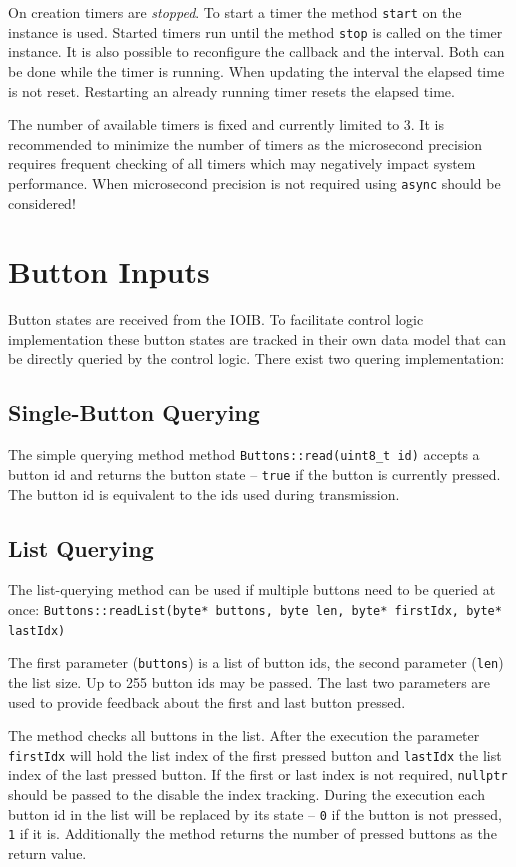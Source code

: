 \documentclass{scrreprt}
\newcommand{\code}[1]{\texttt{#1}}
\begin{document}
On creation timers are \emph{stopped}.
To start a timer the method \code{start} on the instance is used.
Started timers run until the method \code{stop} is called on the timer instance.
It is also possible to reconfigure the callback and the interval.
Both can be done while the timer is running.
When updating the interval the elapsed time is not reset.
Restarting an already running timer resets the elapsed time.

The number of available timers is fixed and currently limited to 3.
It is recommended to minimize the number of timers as the microsecond precision requires frequent checking of all timers which may negatively impact system performance.
When microsecond precision is not required using \code{async} should be considered!

\section{Button Inputs}
Button states are received from the IOIB.
To facilitate control logic implementation these button states are tracked in their own data model that can be directly queried by the control logic.
There exist two quering implementation:

\subsection{Single-Button Querying}
The simple querying method method \code{Buttons::read(uint8\_t id)} accepts a button id and returns the button state -- \code{true} if the button is currently pressed.
The button id is equivalent to the ids used during transmission.

\subsection{List Querying}
The list-querying method can be used if multiple buttons need to be queried at once:
\code{Buttons::readList(byte* buttons, byte len, byte* firstIdx, byte* lastIdx)}

The first parameter (\code{buttons}) is a list of button ids, the second parameter (\code{len}) the list size.
Up to 255 button ids may be passed.
The last two parameters are used to provide feedback about the first and last button pressed.

The method checks all buttons in the list.
After the execution the parameter \code{firstIdx} will hold the list index of the first pressed button and \code{lastIdx} the list index of the last pressed button.
If the first or last index is not required, \code{nullptr} should be passed to the disable the index tracking.
During the execution each button id in the list will be replaced by its state -- \code{0} if the button is not pressed, \code{1} if it is.
Additionally the method returns the number of pressed buttons as the return value.
\end{document}
